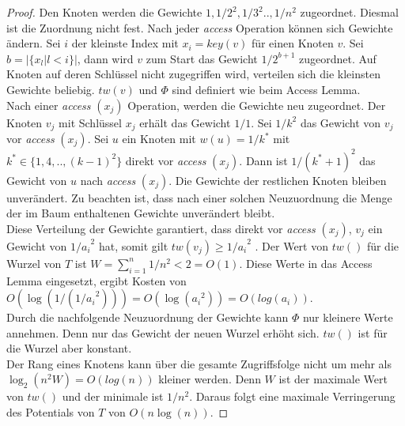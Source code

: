 \documentclass[a4paper,12pt]{article}
\begin{document}
\begin{proof}
	Den Knoten werden die Gewichte $1, 1/2^2,1/3^2 .., 1/n^2$ zugeordnet. Diesmal ist die Zuordnung nicht fest. Nach jeder \textit{access} Operation können sich Gewichte ändern. Sei $i$ der kleinste Index mit $x_i = \mathit{key}\left(v\right)$ für einen Knoten $v$. Sei $b = \vert\{x_l \vert l < i\}\vert$, dann wird $v$ zum Start das Gewicht $1 / 2^{b+1}$ zugeordnet. Auf Knoten auf deren Schlüssel nicht zugegriffen wird, verteilen sich die kleinsten Gewichte beliebig. $\mathit{tw}\left(v\right)$ und $\Phi$ sind definiert wie beim Access Lemma.\\
	Nach einer \textit{access} $\left(x_j\right)$ Operation, werden die Gewichte neu zugeordnet. Der Knoten $v_j$ mit Schlüssel $x_j$ erhält das Gewicht $1/1$. Sei $1/k^2$ das Gewicht von $v_j$ vor \textit{access} $\left(x_j\right)$. Sei $u$ ein Knoten mit $w\left(u\right) = 1 / k^*$ mit \\ $k^* \in \{1, 4,.., \left(k-1\right)^2\}$ direkt vor \textit{access} $\left(x_j\right)$. Dann ist $1 /\left(k^* + 1\right)^2$ das Gewicht von $u$ nach \textit{access} $\left(x_j\right)$. Die Gewichte der restlichen Knoten bleiben unverändert. Zu beachten ist, dass nach einer solchen Neuzuordnung die Menge der im Baum enthaltenen Gewichte unverändert bleibt. \\
	Diese Verteilung der Gewichte garantiert, dass direkt vor  \textit{access} $\left(x_j\right)$, $v_j$ ein Gewicht von ${1 /a_i}^2$ hat, somit gilt $\mathit{tw}\left(v_j\right) \geq {1 /a_i}^2$ . Der Wert von $\mathit{tw}\left(\right)$ für die Wurzel von $T$ ist $W = \sum_{i = 1}^{n} 1/ n^2 < 2 = O\left(1\right) $. Diese Werte in das Access Lemma eingesetzt, ergibt Kosten von \\ $O\left(\log\left(1 / \left({1 /a_i}^2\right)\right)\right) = O\left(\log\left({a_i}^2 \right)\right) = O\left(log\left(a_i\right)\right)$.\\
	 Durch die nachfolgende Neuzuordnung der Gewichte kann $\Phi$ nur kleinere Werte annehmen. Denn nur das Gewicht der neuen Wurzel erhöht sich. $\mathit{tw}\left(\right)$ ist für die Wurzel aber konstant.\\
	Der Rang eines Knotens kann über die gesamte Zugriffsfolge nicht um mehr als $\log_2\left(n^2 W\right) = O\left(log\left(n\right)\right)$ kleiner werden. Denn $W$ ist der maximale Wert von $\mathit{tw}\left(\right)$ und  der minimale ist $1 /n^2$. Daraus folgt eine maximale Verringerung des Potentials von $T$ von $O\left(n \log \left(n\right)\right)$. 
\end{proof}
\end{document}
